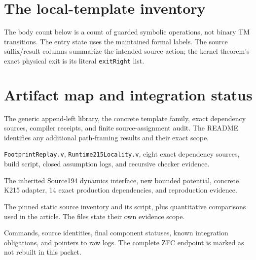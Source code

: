 \documentclass[11pt,letterpaper]{article}
\theoremstyle{definition}
\theoremstyle{remark}
\newcommand{\code}[1]{\texttt{#1}}
\begin{document}
\clearpage
\appendix
\section{The local-template inventory}

The body count below is a count of guarded symbolic operations, not binary
TM transitions. The entry state uses the maintained formal labels. The
source suffix/result columns summarize the intended source action; the
kernel theorem's exact physical exit is its literal \code{exitRight} list.


\clearpage
\section{Artifact map and integration status}

\begin{description}[style=nextline,leftmargin=1.5em]
\item[\code{lean-runtime/}]
The generic append-left library, the concrete template family, exact
dependency sources, compiler receipts, and finite source-assignment audit.
The README identifies any additional path-framing results and their exact
scope.
\item[\code{rocq-locality/}]
\code{FootprintReplay.v}, \code{Runtime215Locality.v}, eight exact dependency
sources, build script, closed assumption logs, and recursive checker evidence.
\item[\code{lean-scheduler/}]
The inherited Source194 dynamics interface, new bounded potential, concrete
K215 adapter, 14 exact production dependencies, and reproduction evidence.
\item[\code{audit/}]
The pinned static source inventory and its script, plus quantitative
comparisons used in the article. The files state their own evidence scope.
\item[\code{README.md} and \code{VERIFICATION.json}]
Commands, source identities, final component statuses, known integration
obligations, and pointers to raw logs. The complete ZFC endpoint is marked
as not rebuilt in this packet.
\end{description}
\end{document}
